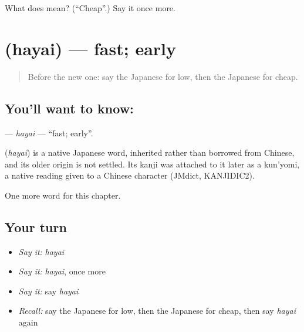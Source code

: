 \begin{tcolorbox}[breakable,colback=teal!4,colframe=teal!35!black,title={Before you move on}]
What does  mean? (\textquotedblleft{}Cheap\textquotedblright{}.) Say it once more.
\end{tcolorbox}
\section[\texorpdfstring{\ja{はやい} (hayai)}{はやい (hayai)}]{ (hayai) — fast; early}

\label{lesson:JA-C49-hayai}



\begin{quote}
Before the new one: say the Japanese for low, then the Japanese for cheap.
\end{quote}

\subsection*{You'll want to know: }
\textbf{} — \emph{hayai} — \textquotedblleft{}fast; early\textquotedblright{}.

\begin{cousinweb}
\textbf{} (\emph{hayai}) is a native Japanese word, inherited rather than borrowed from Chinese, and its older origin is not settled. Its kanji was attached to it later as a kun'yomi, a native reading given to a Chinese character (JMdict, KANJIDIC2).
\end{cousinweb}

\begin{grammarlens}[title={What you've built}]
One more word for this chapter.
\end{grammarlens}

\subsection*{Your turn}
\begin{itemize}
\raggedright
  \item \emph{Say it:} \emph{hayai}
  \item \emph{Say it:} \emph{hayai}, once more
  \item \emph{Say it:} say \emph{hayai}
  \item \emph{Recall:} say the Japanese for low, then the Japanese for cheap, then say \emph{hayai} again
\end{itemize}

